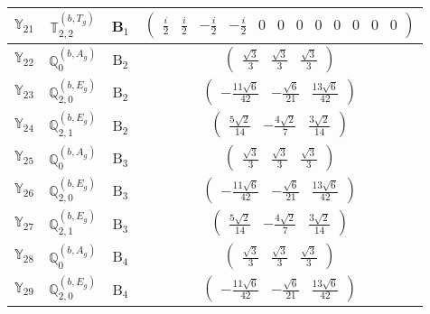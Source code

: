 \documentclass[fleqn,10pt,landscape]{article}
\begin{document}
\begin{itemize}
\begin{center}
\begin{longtable}{c|c|c|c}
$ \mathbb{Y}_{21} $ & $\mathbb{T}_{2,2}^{(b,T_{g})}$ & B$_{1}$ & $\begin{pmatrix} \frac{i}{2} & \frac{i}{2} & - \frac{i}{2} & - \frac{i}{2} & 0 & 0 & 0 & 0 & 0 & 0 & 0 & 0 \end{pmatrix}$ \\ \hline
$ \mathbb{Y}_{22} $ & $\mathbb{Q}_{0}^{(b,A_{g})}$ & B$_{2}$ & $\begin{pmatrix} \frac{\sqrt{3}}{3} & \frac{\sqrt{3}}{3} & \frac{\sqrt{3}}{3} \end{pmatrix}$ \\
$ \mathbb{Y}_{23} $ & $\mathbb{Q}_{2,0}^{(b,E_{g})}$ & B$_{2}$ & $\begin{pmatrix} - \frac{11 \sqrt{6}}{42} & - \frac{\sqrt{6}}{21} & \frac{13 \sqrt{6}}{42} \end{pmatrix}$ \\
$ \mathbb{Y}_{24} $ & $\mathbb{Q}_{2,1}^{(b,E_{g})}$ & B$_{2}$ & $\begin{pmatrix} \frac{5 \sqrt{2}}{14} & - \frac{4 \sqrt{2}}{7} & \frac{3 \sqrt{2}}{14} \end{pmatrix}$ \\ \hline
$ \mathbb{Y}_{25} $ & $\mathbb{Q}_{0}^{(b,A_{g})}$ & B$_{3}$ & $\begin{pmatrix} \frac{\sqrt{3}}{3} & \frac{\sqrt{3}}{3} & \frac{\sqrt{3}}{3} \end{pmatrix}$ \\
$ \mathbb{Y}_{26} $ & $\mathbb{Q}_{2,0}^{(b,E_{g})}$ & B$_{3}$ & $\begin{pmatrix} - \frac{11 \sqrt{6}}{42} & - \frac{\sqrt{6}}{21} & \frac{13 \sqrt{6}}{42} \end{pmatrix}$ \\
$ \mathbb{Y}_{27} $ & $\mathbb{Q}_{2,1}^{(b,E_{g})}$ & B$_{3}$ & $\begin{pmatrix} \frac{5 \sqrt{2}}{14} & - \frac{4 \sqrt{2}}{7} & \frac{3 \sqrt{2}}{14} \end{pmatrix}$ \\ \hline
$ \mathbb{Y}_{28} $ & $\mathbb{Q}_{0}^{(b,A_{g})}$ & B$_{4}$ & $\begin{pmatrix} \frac{\sqrt{3}}{3} & \frac{\sqrt{3}}{3} & \frac{\sqrt{3}}{3} \end{pmatrix}$ \\
$ \mathbb{Y}_{29} $ & $\mathbb{Q}_{2,0}^{(b,E_{g})}$ & B$_{4}$ & $\begin{pmatrix} - \frac{11 \sqrt{6}}{42} & - \frac{\sqrt{6}}{21} & \frac{13 \sqrt{6}}{42} \end{pmatrix}$ \\

\end{longtable}
\end{center}
\end{itemize}
\end{document}
